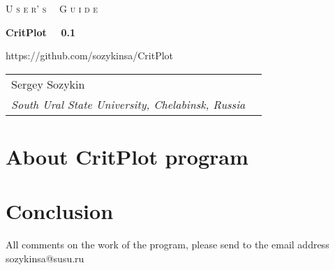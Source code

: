 \documentclass{article}
\begin{document}
\begin{titlepage}
	
	\begin{center}
		
		\vspace{1cm}

		{\Huge \textsc{U s e r' s \, \, G u i d e}}
		
		
		\vspace{1cm}
		\hrulefill
		\vspace{1cm}
		
		{\Huge \textbf{CritPlot \, \, 0.1}}
		
		\vspace{1cm}
		\hrulefill
		\vspace{0.5cm}
		
		
		\vspace{1.5cm}
		{\Large https://github.com/sozykinsa/CritPlot}
		
		\vspace{2.5cm}
		\vspace{1.0cm}
		
		\begin{tabular}{ll}
			
			Sergey Sozykin  \\  %
			\textit{South Ural State University, Chelabinsk, Russia} \\
			
						
		\end{tabular}
		
	\end{center}
	
\end{titlepage}

	
	
\section{About CritPlot program}


\section{Conclusion}
All comments on the work of the program, please send to the email address sozykinsa@susu.ru
	

	
\end{document}
